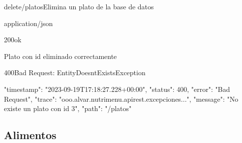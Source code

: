 \begin{apiRoute}{delete}{/platos}{Elimina un plato de la base de datos}
	\begin{routeParameter}
	\end{routeParameter}
	\begin{routeResponse}{application/json}
		\begin{routeResponseItem}{200}{ok}
			\begin{routeResponseItemBody}
Plato con id eliminado correctamente	
			\end{routeResponseItemBody}
		\end{routeResponseItem}
		
\begin{routeResponseItem}{400}{Bad Request: EntityDoesntExistsException}
			\begin{routeResponseItemBody}
{
    "timestamp": "2023-09-19T17:18:27.228+00:00",
    "status": 400,
    "error": "Bad Request",
    "trace": "ooo.alvar.nutrimenu.apirest.excepciones...",
    "message": "No existe un plato con id 3",
    "path": "/platos"
}
			\end{routeResponseItemBody}
		\end{routeResponseItem}
		
	\end{routeResponse}
\end{apiRoute}

\subsection{Alimentos}

